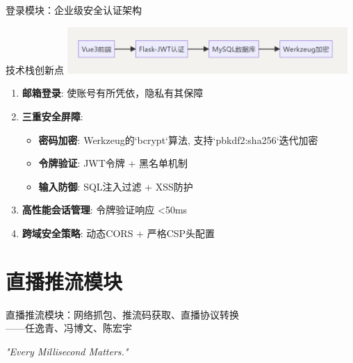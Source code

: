 \documentclass{beamer}
\begin{document}
	\begin{frame}{登录模块：企业级安全认证架构}
		\begin{block}{技术栈创新点}
			\centering
			\includegraphics[width=0.8\textwidth]{pic/login_arch.png}
		\end{block}
		\begin{enumerate}
			\item \textbf{邮箱登录}: 使账号有所凭依，隐私有其保障
			\item \textbf{三重安全屏障}:
			\begin{itemize}
				\item \textbf{密码加密}: Werkzeug的`bcrypt`算法, 支持`pbkdf2:sha256`迭代加密
				\item \textbf{令牌验证}: JWT令牌 + 黑名单机制
				\item \textbf{输入防御}: SQL注入过滤 + XSS防护
			\end{itemize}
			\item \textbf{高性能会话管理}: 令牌验证响应 <50ms
			\item \textbf{跨域安全策略}: 动态CORS + 严格CSP头配置
		\end{enumerate}
	\end{frame}
	
	\section{直播推流模块}
	
	\begin {frame}{直播推流模块：网络抓包、推流码获取、直播协议转换 \\
		\hfill ——任逸青、冯博文、陈宏宇}

		\centering
		\textit{"Every Millisecond Matters."} \\
		\vspace {1em}
	\end{frame}
	
\end{document}
